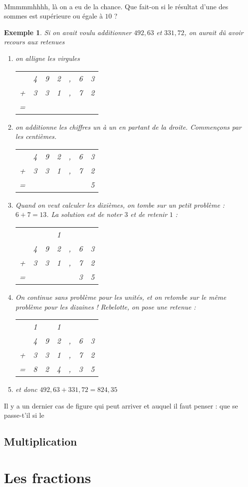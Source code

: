 \documentclass[12pt]{article}
\newtheorem*{example}{Exemple}
\begin{document}
\paragraph{}
Mmmmmhhhh, là on a eu de la chance. Que fait-on si le résultat d'une des sommes est supérieure ou égale à $10$ ?

\begin{example}
Si on avait voulu additionner $492,63$ et $331,72$, on aurait dû avoir recours aux retenues

\begin{enumerate}

 
\item on alligne les virgules

\begin{tabular}{c c c c c c c}
  & 4 & 9 & 2 & , & 6 & 3 \\
+ & 3 & 3 & 1 & , & 7 & 2 \\
\hline
=\\
\end{tabular}

\item on additionne les chiffres un à un en partant de la droite. Commençons par les centièmes.

\begin{tabular}{c c c c c c c}
  & 4 & 9 & 2 & , & 6 & 3 \\
+ & 3 & 3 & 1 & , & 7 & 2 \\
\hline
= &  &  &  &  &  & 5
\end{tabular}
 
\item Quand on veut calculer les dixièmes, on tombe sur un petit problème : $6 + 7 = 13$. La solution est de noter $3$ et de retenir $1$ :

\begin{tabular}{c c c c c c c}
  &   &   & 1 &   &   &   \\
  & 4 & 9 & 2 & , & 6 & 3 \\
+ & 3 & 3 & 1 & , & 7 & 2 \\
\hline
= &  &  &  &  & 3  & 5
\end{tabular}

\item On continue sans problème pour les unités, et on retombe sur le même problème pour les dizaines ! Rebelotte, on pose une retenue :

\begin{tabular}{c c c c c c c}
  & 1 &  & 1 &   &   &   \\
  & 4 & 9 & 2 & , & 6 & 3 \\
+ & 3 & 3 & 1 & , & 7 & 2 \\
\hline
= & 8 & 2 & 4 & , & 3  & 5
\end{tabular}
 

\item et donc $492,63 + 331,72 = 824,35 $
\end{enumerate}
\end{example}

Il y a un dernier cas de figure qui peut arriver et auquel il faut penser : que se passe-t'il si le
\subsection{Multiplication}

\section{Les fractions}
\end{document}
